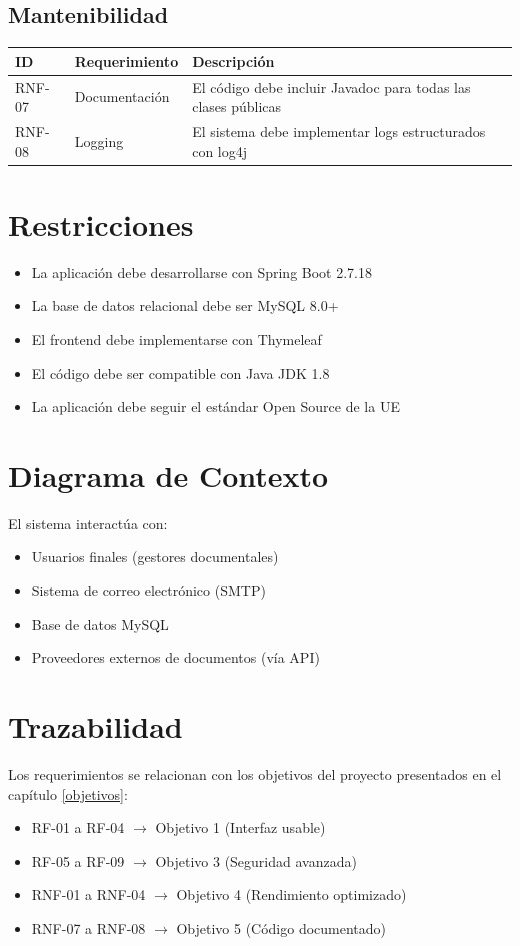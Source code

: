 \subsection{Mantenibilidad}

\begin{longtable}{|>{\raggedright\arraybackslash}p{2cm}|>{\raggedright\arraybackslash}p{4cm}|>{\raggedright\arraybackslash}p{8cm}|}
\hline
\textbf{ID} & \textbf{Requerimiento} & \textbf{Descripción} \\
\hline
RNF-07 & Documentación & El código debe incluir Javadoc para todas las clases públicas \\
\hline
RNF-08 & Logging & El sistema debe implementar logs estructurados con log4j \\
\hline
\end{longtable}

\section{Restricciones}
\begin{itemize}
\item La aplicación debe desarrollarse con Spring Boot 2.7.18
\item La base de datos relacional debe ser MySQL 8.0+
\item El frontend debe implementarse con Thymeleaf
\item El código debe ser compatible con Java JDK 1.8
\item La aplicación debe seguir el estándar Open Source de la UE
\end{itemize}

\section{Diagrama de Contexto}
El sistema interactúa con:
\begin{itemize}
\item Usuarios finales (gestores documentales)
\item Sistema de correo electrónico (SMTP)
\item Base de datos MySQL
\item Proveedores externos de documentos (vía API)
\end{itemize}

\section{Trazabilidad}
Los requerimientos se relacionan con los objetivos del proyecto presentados en el capítulo \ref{objetivos}:
\begin{itemize}
\item RF-01 a RF-04 $\rightarrow$ Objetivo 1 (Interfaz usable)
\item RF-05 a RF-09 $\rightarrow$ Objetivo 3 (Seguridad avanzada)
\item RNF-01 a RNF-04 $\rightarrow$ Objetivo 4 (Rendimiento optimizado)
\item RNF-07 a RNF-08 $\rightarrow$ Objetivo 5 (Código documentado)
\end{itemize}

